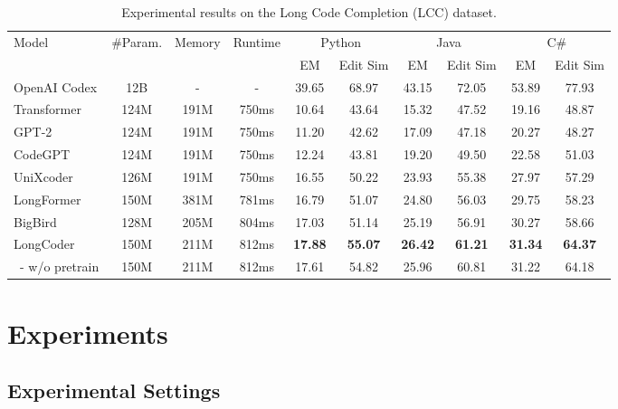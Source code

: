 \documentclass{article}
\begin{document}
\begin{table}[t]
\caption{Experimental results on the Long Code Completion (LCC) dataset.}
\label{tab:longcompletion}
\begin{center}
\begin{tabular}{lccccccccc}
    \toprule
    \multirow{2}{*}{Model} & \multirow{2}{*}{\#Param.} & \multirow{2}{*}{Memory} & \multirow{2}{*}{Runtime} & \multicolumn{2}{c}{Python} & \multicolumn{2}{c}{Java}& \multicolumn{2}{c}{C\#} \\
    \cmidrule(lr){5-6} \cmidrule(lr){7-8} \cmidrule(lr){9-10}
    & & & & EM &Edit Sim&EM &Edit Sim&EM &Edit Sim  \\
    \midrule
    OpenAI Codex & 12B&-&-& 39.65& 68.97& 43.15 &72.05 & 53.89&77.93\\
    \midrule
    Transformer & 124M&191M&750ms& 10.64 & 43.64& 15.32 & 47.52& 19.16 & 48.87\\
    GPT-2 & 124M& 191M&750ms &  11.20 & 42.62& 17.09 & 47.18& 20.27 & 48.27\\
    CodeGPT & 124M& 191M&750ms & 12.24 & 43.81& 19.20 & 49.50& 22.58 & 51.03\\
    UniXcoder & 126M& 191M&750ms & 16.55 & 50.22& 23.93 & 55.38& 27.97 & 57.29\\
    \midrule
    LongFormer &150M & 381M& 781ms& 16.79 & 51.07& 24.80 & 56.03& 29.75 & 58.23\\
    BigBird & 128M& 205M& 804ms&17.03  &51.14 &25.19 &56.91&30.27&58.66\\
    \midrule
    LongCoder & 150M& 211M& 812ms& \bf{17.88} & \bf{55.07}& \bf{26.42} & \bf{61.21}& \bf{31.34} & \bf{64.37}\\
    \ - w/o pretrain &150M & 211M& 812ms& 17.61 &54.82 &25.96 & 60.81 &31.22 &64.18\\
    
    \bottomrule
\end{tabular}
\end{center}

\end{table}

\section{Experiments}
\subsection{Experimental Settings}
\end{document}
